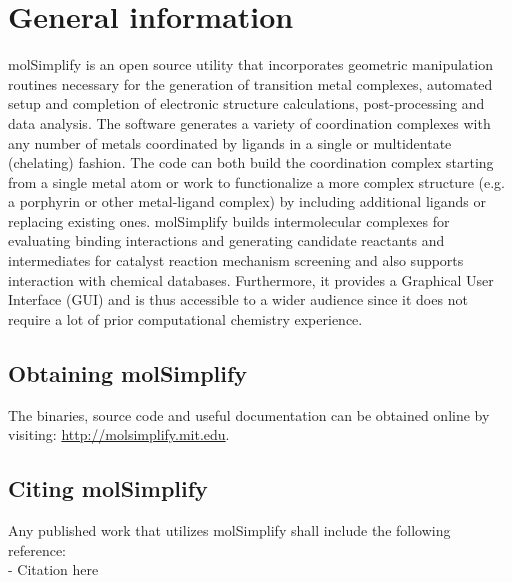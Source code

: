 \documentclass[a4paper,12pt]{assignment}
\begin{document}
\maketitle

\tableofcontents

\clearpage


\section{General information}

molSimplify is an open source utility that incorporates geometric manipulation routines necessary for the generation of transition metal complexes, automated setup and completion of electronic structure calculations, post-processing and data analysis. The software generates a variety of coordination complexes with any number of metals coordinated by ligands in a single or multidentate (chelating) fashion. The code can both build the coordination complex starting from a single metal atom or work to functionalize a more complex structure (e.g. a porphyrin or other metal-ligand complex) by including additional ligands or replacing existing ones. molSimplify builds intermolecular complexes for evaluating binding interactions and generating candidate reactants and intermediates for catalyst reaction mechanism screening and also supports interaction with chemical databases. Furthermore, it provides a Graphical User Interface (GUI) and is thus accessible to a wider audience since it does not require a lot of prior computational chemistry experience.

\subsection{Obtaining molSimplify}
The binaries, source code and useful documentation can be obtained online by visiting: \url{http://molsimplify.mit.edu}. 


\subsection{Citing molSimplify}

Any published work that utilizes molSimplify shall include the following reference: \\ 

- Citation here
\end{document}

